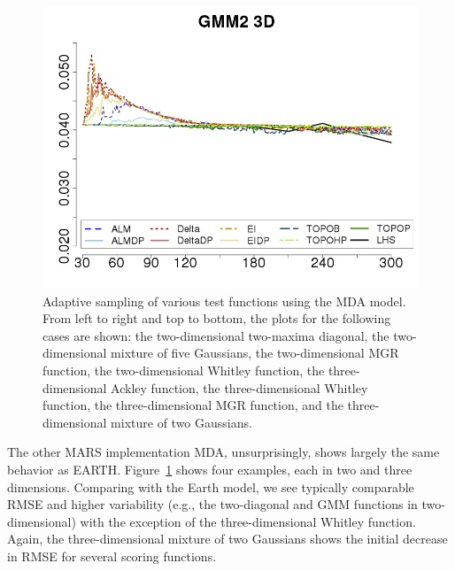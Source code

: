 \begin{figure}[t]
\begin{center}
  \includegraphics[width=0.3\linewidth]{figs/chap5/mda_GMM2_3D_td=30}
\caption{Adaptive sampling of various test functions using the MDA model. From left to right and top to bottom, the plots for the following cases are shown: the two-dimensional two-maxima diagonal, the two-dimensional mixture of five Gaussians, the two-dimensional MGR function, the two-dimensional Whitley function, the three-dimensional Ackley function, the three-dimensional Whitley function, the three-dimensional MGR function, and the three-dimensional mixture of two Gaussians.}
\label{fig:mda}
\end{center}
\end{figure}

The other MARS implementation MDA, unsurprisingly, shows largely the same behavior as EARTH.
%
Figure~\ref{fig:mda} shows four examples, each in two and three dimensions.
%
Comparing with the Earth model, we see typically comparable RMSE and higher variability (e.g., the two-diagonal and GMM functions in two-dimensional) with the exception of the three-dimensional Whitley function.
%
Again, the three-dimensional mixture of two Gaussians shows the initial decrease in RMSE for several scoring functions.

